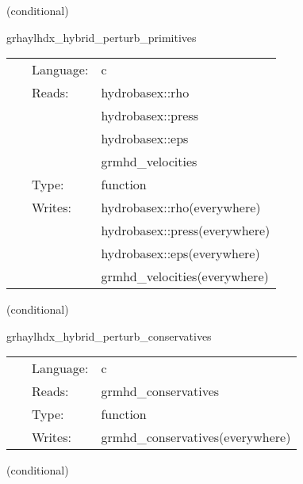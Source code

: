 \documentclass{article}
\begin{document}
   (conditional) 

\hspace{5mm} grhaylhdx\_hybrid\_perturb\_primitives 

\hspace{5mm}{\it hybrid version of grhaylhdx\_perturb\_primitives } 


\hspace{5mm}

 \begin{tabular*}{160mm}{cll} 
~ & Language:  & c \\ 
~ & Reads:  & hydrobasex::rho \\ 
~& ~ &hydrobasex::press\\ 
~& ~ &hydrobasex::eps\\ 
~& ~ &grmhd\_velocities\\ 
~ & Type:  & function \\ 
~ & Writes:  & hydrobasex::rho(everywhere) \\ 
~& ~ &hydrobasex::press(everywhere)\\ 
~& ~ &hydrobasex::eps(everywhere)\\ 
~& ~ &grmhd\_velocities(everywhere)\\ 
\end{tabular*} 


\vspace{5mm}

   (conditional) 

\hspace{5mm} grhaylhdx\_hybrid\_perturb\_conservatives 

\hspace{5mm}{\it hybrid version of grhaylhdx\_perturb\_conservatives } 


\hspace{5mm}

 \begin{tabular*}{160mm}{cll} 
~ & Language:  & c \\ 
~ & Reads:  & grmhd\_conservatives \\ 
~ & Type:  & function \\ 
~ & Writes:  & grmhd\_conservatives(everywhere) \\ 
\end{tabular*} 


\vspace{5mm}

   (conditional) 
\end{document}
